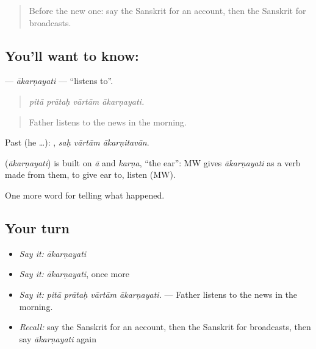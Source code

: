 \label{lesson:SA-C309-akarnayati}



\begin{quote}
Before the new one: say the Sanskrit for an account, then the Sanskrit for broadcasts.
\end{quote}

\subsection*{You'll want to know: }
\textbf{} — \emph{ākarṇayati} — \textquotedblleft{}listens to\textquotedblright{}.

\begin{quote}
   
\end{quote}

\begin{quote}
\emph{pitā prātaḥ vārtām ākarṇayati.}
\end{quote}

\begin{quote}
Father listens to the news in the morning.
\end{quote}

Past (he …):   , \emph{saḥ vārtām ākarṇitavān}.

\begin{cousinweb}
\textbf{} (\emph{ākarṇayati}) is built on \emph{ā} and \emph{karṇa}, \textquotedblleft{}the ear\textquotedblright{}: MW gives \emph{ākarṇayati} as a verb made from them, to give ear to, listen (MW).
\end{cousinweb}

\begin{grammarlens}[title={What you've built}]
One more word for telling what happened.
\end{grammarlens}

\subsection*{Your turn}
\begin{itemize}
\raggedright
  \item \emph{Say it:} \emph{ākarṇayati}
  \item \emph{Say it:} \emph{ākarṇayati}, once more
  \item \emph{Say it:} \emph{pitā prātaḥ vārtām ākarṇayati.} — Father listens to the news in the morning.
  \item \emph{Recall:} say the Sanskrit for an account, then the Sanskrit for broadcasts, then say \emph{ākarṇayati} again
\end{itemize}

